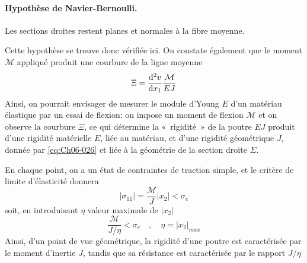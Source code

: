 \paragraph{Hypothèse de Navier-Bernoulli.} Les sections droites restent planes et normales à la fibre moyenne.

Cette hypothèse se trouve donc vérifiée ici.
On constate également que le moment $\mathcal{M}$ appliqué produit une courbure de la ligne moyenne
\begin{equation}
    \Xi = \frac{\mathrm{d}^2 v}{\mathrm{d} x_1} \frac{\mathcal{M}}{EJ}
    \label{eq:Ch07-034}
\end{equation}
Ainsi, on pourrait envisager de mesurer le module d'Young $E$ d'un matériau élastique par un essai de flexion: on impose un moment de flexion $\mathcal{M}$ et on observe la courbure $\Xi$, ce qui détermine la «~rigidité~» de la poutre $EJ$ produit d'une rigidité matérielle $E$, liée au matériau, et d'une rigidité géométrique $J$, donnée par \eqref{eq:Ch06-026} et liée à la géométrie de la section droite $\Sigma$.

En chaque point, on a un état de contraintes de traction simple, et le critère de limite d'élasticité donnera 
\begin{equation}
    \left|\sigma_{11}\right| = \frac{\mathcal{M}}{J} \left|x_2\right| < \sigma_e
    \label{eq:Ch07-035}
\end{equation}
soit, en introduisant $\eta$ valeur maximale de $\left|x_2\right|$
\begin{equation}
    \frac{\mathcal{M}}{J/\eta} < \sigma_e \quad , \quad \eta = \left|x_2\right|_{max}
    \label{eq:Ch07-036}
\end{equation}
Ainsi, d'un point de vue géométrique, la rigidité d'une poutre est caractérisée  par le moment  d'inertie $J$,  tandis que sa résistance est caractérisée par le rapport $J/\eta$

